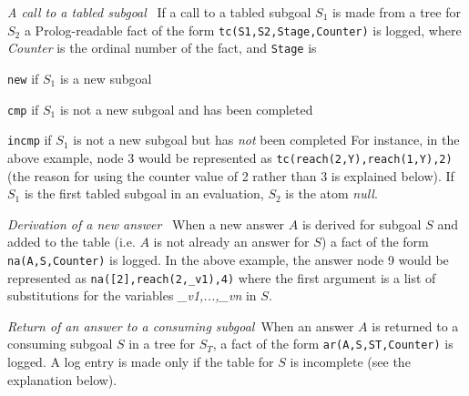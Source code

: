 \bi
\item {\em A call to a tabled subgoal}~ If a call to a tabled subgoal
  $S_1$ is made from a tree for $S_2$ a Prolog-readable fact of the
  form {\tt tc(S1,S2,Stage,Counter)} is logged, where {\em Counter} is
  the ordinal number of the fact, and {\tt Stage} is
\bi
\item {\tt new} if $S_1$ is a new subgoal
\item {\tt cmp} if $S_1$ is not a new subgoal and has been completed
\item {\tt incmp} if $S_1$ is not a new subgoal but has {\em not} been
  completed \ei
%
  For instance, in the above example, node 3 would be represented as
  {\tt tc(reach(2,Y),reach(1,Y),2)} (the reason for using the counter
  value of 2 rather than 3 is explained below).  If $S_1$ is the first
  tabled subgoal in an evaluation, $S_2$ is the atom {\em null}.

\item {\em Derivation of a new answer}~ When a new answer $A$ is
  derived for subgoal $S$ and added to the table (i.e. $A$ is not
  already an answer for $S$) a fact of the form {\tt na(A,S,Counter)}
  is logged.  In the above example, the answer node 9 would be
  represented as {\tt na([2],reach(2,\_v1),4)} where the first argument
  is a list of substitutions for the variables {\em \_v1,...,\_vn} in
  $S$.

\item {\em Return of an answer to a consuming subgoal}~When an answer
  $A$ is returned to a consuming subgoal $S$ in a tree for $S_T$, a
  fact of the form {\tt ar(A,S,ST,Counter)} is logged.  A log entry is
  made only if the table for $S$ is incomplete (see the explanation
  below).

